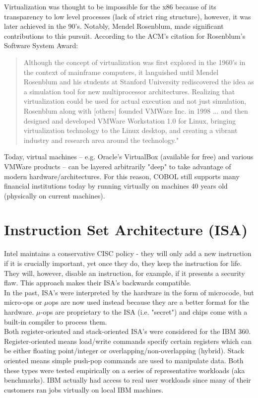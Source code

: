 \documentclass[twoside]{article}
\begin{document}
Virtualization was thought to be impossible for the x86 because of its transparency to low level processes (lack of strict ring structure), however, it was later achieved in the 90's. Notably, Mendel Rosenblum, made significant contributions to this pursuit. According to the ACM's citation for Rosenblum's Software System Award:
\begin{quote}
Although the concept of virtualization was first explored in the 1960's in the context of mainframe computers, it languished until Mendel Rosenblum and his students at Stanford University rediscovered the idea as a simulation tool for new multiprocessor architectures. Realizing that virtualization could be used for actual execution and not just simulation, Rosenblum along with [others] founded VMWare Inc. in 1998 ... and then designed and developed VMWare Workstation 1.0 for Linux, bringing virtualization technology to the Linux desktop, and creating a vibrant industry and research area around the technology."
\end{quote}

Today, virtual machines -- e.g. Oracle's VirtualBox (available for free) and various VMWare products -- can be layered arbitrarily "deep" to take advantage of modern hardware/architectures.  For this reason, COBOL still supports many financial institutions today by running virtually on machines 40 years old (physically on current machines).  

\section{Instruction Set Architecture (ISA)}
Intel maintains a conservative CISC policy - they will only add a new instruction if it is crucially important, yet once they do, they keep the instruction for life.  They will, however, disable an instruction, for example, if it presents a security flaw.  This approach makes their ISA's backwards compatible.\\

In the past, ISA's were interpreted by the hardware in the form of microcode, but micro-ops or $\mu$ops are now used instead because they are a better format for the hardware. $\mu$-ops are proprietary to the ISA (i.e. "secret") and chips come with a built-in compiler to process them.\\

Both register-oriented and stack-oriented ISA's were considered for the IBM 360.  Register-oriented means load/write commands specify certain registers which can be either floating point/integer or overlapping/non-overlapping (hybrid).  Stack oriented means simple push-pop commands are used to manipulate data.  Both these types were tested empirically on a series of representative workloads (aka benchmarks).  IBM actually had access to real user workloads since many of their customers ran jobs virtually on local IBM machines.
\end{document}
